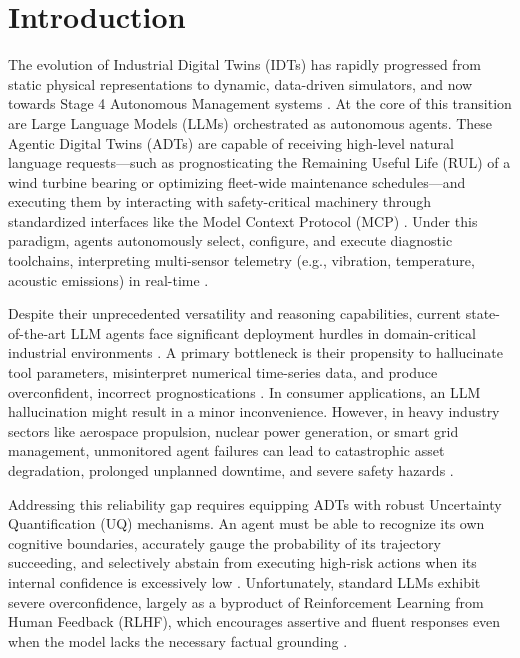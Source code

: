 \documentclass[10pt,twocolumn,a4paper]{article}
\begin{document}
\section{Introduction}
The evolution of Industrial Digital Twins (IDTs) has rapidly progressed from static physical representations to dynamic, data-driven simulators, and now towards Stage 4 Autonomous Management systems \cite{grieves2014digital, tao2019digital}. At the core of this transition are Large Language Models (LLMs) orchestrated as autonomous agents. These Agentic Digital Twins (ADTs) are capable of receiving high-level natural language requests—such as prognosticating the Remaining Useful Life (RUL) of a wind turbine bearing or optimizing fleet-wide maintenance schedules—and executing them by interacting with safety-critical machinery through standardized interfaces like the Model Context Protocol (MCP) \cite{anthropic2024mcp, yao2022react}. Under this paradigm, agents autonomously select, configure, and execute diagnostic toolchains, interpreting multi-sensor telemetry (e.g., vibration, temperature, acoustic emissions) in real-time \cite{feng2026phmforge}.

Despite their unprecedented versatility and reasoning capabilities, current state-of-the-art LLM agents face significant deployment hurdles in domain-critical industrial environments \cite{boiko2023autonomous}. A primary bottleneck is their propensity to hallucinate tool parameters, misinterpret numerical time-series data, and produce overconfident, incorrect prognostications \cite{huang2023survey}. In consumer applications, an LLM hallucination might result in a minor inconvenience. However, in heavy industry sectors like aerospace propulsion, nuclear power generation, or smart grid management, unmonitored agent failures can lead to catastrophic asset degradation, prolonged unplanned downtime, and severe safety hazards \cite{zhao2023large}.

Addressing this reliability gap requires equipping ADTs with robust Uncertainty Quantification (UQ) mechanisms. An agent must be able to recognize its own cognitive boundaries, accurately gauge the probability of its trajectory succeeding, and selectively abstain from executing high-risk actions when its internal confidence is excessively low \cite{vinod2026calvert}. Unfortunately, standard LLMs exhibit severe overconfidence, largely as a byproduct of Reinforcement Learning from Human Feedback (RLHF), which encourages assertive and fluent responses even when the model lacks the necessary factual grounding \cite{ouyang2022training, kuleshov2018accurate}.
\end{document}
